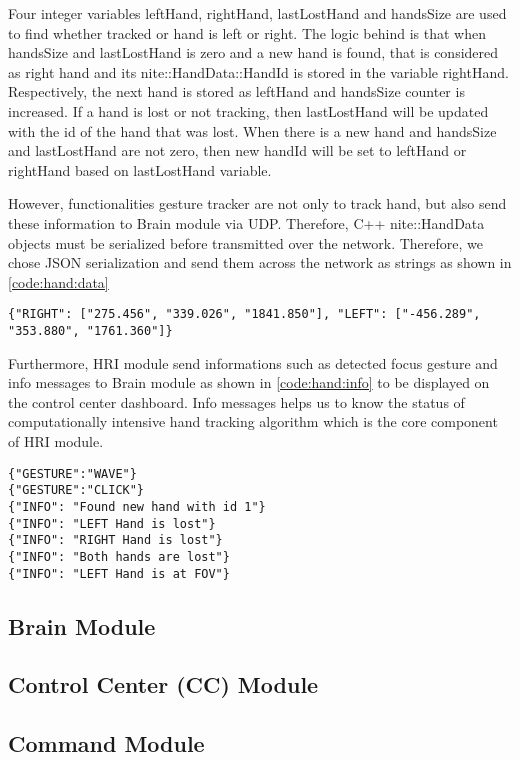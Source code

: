Four integer variables leftHand, rightHand, lastLostHand and handsSize are used to find whether tracked or hand is left or right. The logic behind is that when handsSize and lastLostHand is zero and a new hand is found, that is considered as right hand and its nite::HandData::HandId is stored in the variable rightHand. Respectively, the next hand is stored as leftHand and handsSize counter is increased. If a hand is lost or not tracking, then lastLostHand will be updated with the id of the hand that was lost. When there is a new hand and handsSize and lastLostHand are not zero, then new handId will be set to leftHand or rightHand based on lastLostHand variable.

However, functionalities gesture tracker are not only  to track hand, but also send these information to Brain module via UDP. Therefore, C++  nite::HandData objects must be serialized before transmitted over the network. Therefore, we chose JSON serialization and send them across the network as strings as shown in \ref{code:hand:data}

\begin{lstlisting}
{"RIGHT": ["275.456", "339.026", "1841.850"], "LEFT": ["-456.289", "353.880", "1761.360"]}
\end{lstlisting}
\label{code:hand:data}

Furthermore, HRI module send informations such as detected focus gesture and info messages to Brain module as shown in \ref{code:hand:info} to be displayed on the control center dashboard. Info messages helps us to know the status of computationally intensive hand tracking algorithm which is the core component of HRI module. 

\begin{lstlisting}
{"GESTURE":"WAVE"}
{"GESTURE":"CLICK"}
{"INFO": "Found new hand with id 1"}
{"INFO": "LEFT Hand is lost"}
{"INFO": "RIGHT Hand is lost"}
{"INFO": "Both hands are lost"}
{"INFO": "LEFT Hand is at FOV"}
\end{lstlisting}
\label{code:hand:info}

 
\subsection{Brain Module}

\subsection{Control Center (CC) Module}

\subsection{Command Module} 
